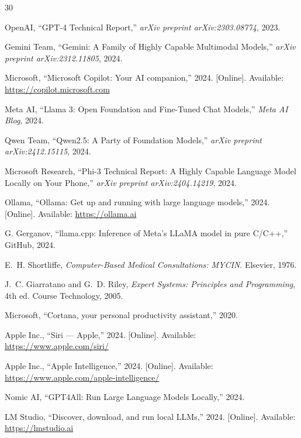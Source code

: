 \documentclass[conference]{IEEEtran}
\begin{document}
\begin{thebibliography}{30}

OpenAI, ``GPT-4 Technical Report,'' \textit{arXiv preprint arXiv:2303.08774}, 2023.

Gemini Team, ``Gemini: A Family of Highly Capable Multimodal Models,'' \textit{arXiv preprint arXiv:2312.11805}, 2024.

Microsoft, ``Microsoft Copilot: Your AI companion,'' 2024. [Online]. Available: \url{https://copilot.microsoft.com}

Meta AI, ``Llama 3: Open Foundation and Fine-Tuned Chat Models,'' \textit{Meta AI Blog}, 2024.

Qwen Team, ``Qwen2.5: A Party of Foundation Models,'' \textit{arXiv preprint arXiv:2412.15115}, 2024.

Microsoft Research, ``Phi-3 Technical Report: A Highly Capable Language Model Locally on Your Phone,'' \textit{arXiv preprint arXiv:2404.14219}, 2024.

Ollama, ``Ollama: Get up and running with large language models,'' 2024. [Online]. Available: \url{https://ollama.ai}

G. Gerganov, ``llama.cpp: Inference of Meta's LLaMA model in pure C/C++,'' GitHub, 2024.

E.~H. Shortliffe, \textit{Computer-Based Medical Consultations: MYCIN}. Elsevier, 1976.

J.~C. Giarratano and G.~D. Riley, \textit{Expert Systems: Principles and Programming}, 4th ed. Course Technology, 2005.

Microsoft, ``Cortana, your personal productivity assistant,'' 2020.

Apple Inc., ``Siri --- Apple,'' 2024. [Online]. Available: \url{https://www.apple.com/siri/}

Apple Inc., ``Apple Intelligence,'' 2024. [Online]. Available: \url{https://www.apple.com/apple-intelligence/}

Nomic AI, ``GPT4All: Run Large Language Models Locally,'' 2024.

LM Studio, ``Discover, download, and run local LLMs,'' 2024. [Online]. Available: \url{https://lmstudio.ai}


\end{thebibliography}
\end{document}
